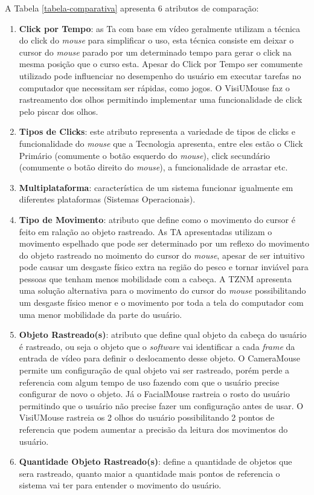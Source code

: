 A Tabela \ref{tabela-comparativa} apresenta 6 atributos de comparação:
\begin{enumerate}
\item \textbf{Click por Tempo}: as Ta com base em vídeo geralmente utilizam a técnica do click do \textit{mouse} para simplificar o uso, esta técnica consiste em deixar o cursor do \textit{mouse} parado por um determinado tempo para gerar o click na mesma posição que o curso esta. Apesar do Click por Tempo ser comumente utilizado pode influenciar no desempenho do usuário em executar tarefas no computador que necessitam ser rápidas, como jogos. O VisiUMouse faz o rastreamento dos olhos permitindo implementar uma funcionalidade de click pelo piscar dos olhos. 
\item \textbf{Tipos de Clicks}: este atributo representa a variedade de tipos de clicks e funcionalidade do \textit{mouse} que a Tecnologia apresenta, entre eles estão o Click Primário (comumente o botão esquerdo do \textit{mouse}), click secundário (comumente o botão direito do \textit{mouse}), a funcionalidade de arrastar etc.
\item \textbf{Multiplataforma}: característica de um sistema funcionar igualmente em diferentes plataformas (Sistemas Operacionais).
\item \textbf{Tipo de Movimento}: atributo que define como o movimento do cursor é feito em ralação ao objeto rastreado. As TA apresentadas utilizam o movimento espelhado que pode ser determinado por um reflexo do movimento do objeto rastreado no moimento do cursor do \textit{mouse}, apesar de ser intuitivo pode causar um desgaste físico extra na região do pesco e tornar inviável para pessoas que tenham menos mobilidade com a cabeça. A TZNM apresenta uma solução alternativa para o movimento do cursor do \textit{mouse} possibilitando um desgaste físico menor e o movimento por toda a tela do computador com uma menor mobilidade da parte do usuário.
\item \textbf{Objeto Rastreado(s)}: atributo que define qual objeto da cabeça do usuário é rastreado, ou seja o objeto que o \textit{software} vai identificar a cada \textit{frame} da entrada de vídeo para definir o deslocamento desse objeto. O CameraMouse permite um configuração de qual objeto vai ser rastreado, porém perde a referencia com algum tempo de uso fazendo com que o usuário precise configurar de novo o objeto. Já o FacialMouse rastreia o rosto do usuário permitindo que o usuário não precise fazer um configuração antes de usar. O VisiUMouse rastreia os 2 olhos do usuário possibilitando 2 pontos de referencia que podem aumentar a precisão da leitura dos movimentos do usuário.
\item \textbf{Quantidade Objeto Rastreado(s)}: define a quantidade de objetos que sera rastreado, quanto maior a quantidade mais pontos de referencia o sistema vai ter para entender o movimento do usuário.
\end{enumerate}







